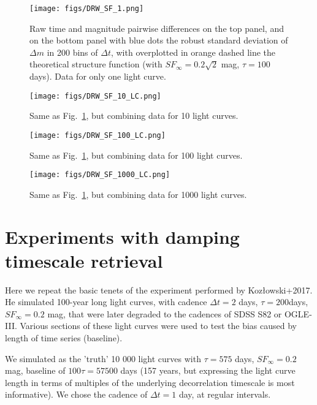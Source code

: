 \documentclass[fleqn,usenatbib]{mnras}  %
\begin{document}
\begin{figure}
\texttt{[image: figs/DRW\_SF\_1.png]}
\caption{Raw time and magnitude pairwise differences on the top panel, and on the bottom panel with blue dots the robust standard deviation of $\Delta m$ in 200 bins of $\Delta t$, with overplotted in orange dashed line the theoretical structure function (with $SF_{\infty}=0.2 \sqrt{2} $ mag, $\tau=100$ days). Data for only one light curve. }
\label{fig:sf_1}
\end{figure}

\begin{figure}
\texttt{[image: figs/DRW\_SF\_10\_LC.png]}
\caption{Same as Fig.~\ref{fig:sf_1}, but combining data for 10 light curves.}
\label{fig:sf_10}
\end{figure}

\begin{figure}
\texttt{[image: figs/DRW\_SF\_100\_LC.png]}
\caption{Same as Fig.~\ref{fig:sf_1}, but combining data for 100 light curves.}
\label{fig:sf_100}
\end{figure}


\begin{figure}
\texttt{[image: figs/DRW\_SF\_1000\_LC.png]}
\caption{Same as Fig.~\ref{fig:sf_1}, but combining data for 1000 light curves.}
\label{fig:sf_1000}
\end{figure}


\section{Experiments with damping timescale retrieval }

Here we repeat the basic tenets of the experiment performed by Kozłowski+2017. He simulated 100-year long light curves, with cadence $\Delta t= 2 $ days, $\tau = 200 $days, $SF_{\infty} = 0.2$ mag, that were later degraded to the cadences of SDSS S82 or OGLE-III. Various sections of these light curves were used to test the bias caused by length of time series (baseline). 

We simulated as the 'truth'  10 000 light curves with $\tau=575 $ days, $SF_{\infty}=0.2$ mag, baseline of $100 \tau = 57500$ days (157 years, but expressing the light curve length in terms of multiples of the underlying decorrelation timescale is most informative). We chose the cadence of $\Delta t=1$ day, at regular intervals.
\end{document}
